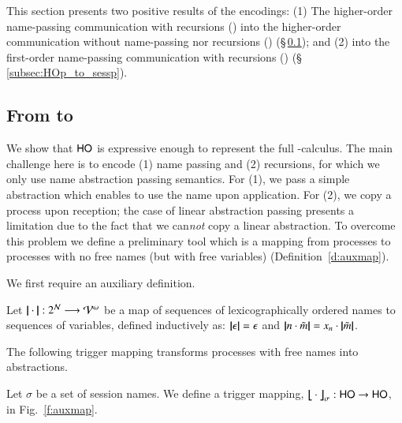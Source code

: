 \noi This section presents two positive results of the encodings:
(1) The higher-order name-passing communication with recursions (\HOp) into 
the higher-order communication without name-passing nor 
recursions (\HO) (\S\,\ref{subsec:HOpi_to_HO}); and (2) 
\HOp into the first-order name-passing communication
with recursions (\sessp) (\S\,\ref{subsec:HOp_to_sessp}). 

\subsection{From \HOp to \HO}
\label{subsec:HOpi_to_HO}
\noi We show that $\mathsf{HO}$ is expressive enough to
represent the full \HOp-calculus.
The main challenge here is to encode (1) name passing 
and (2) recursions, 
for which 
we only use name abstraction passing semantics. For (1), we pass  
a simple abstraction which enables to use the name upon application. 
For (2), we 
copy a process upon reception; the case of linear abstraction passing
presents a limitation due to the fact that we can{\em not} 
copy a linear abstraction.
To overcome this problem we define a preliminary tool which is a mapping from
processes to processes with no free names (but with free variables) (Definition~\ref{d:auxmap}). 

We first require an auxiliary definition.

\smallskip 

\begin{definition}\rm 
\label{def:hop_to_ho}
	Let $|\!|\cdot|\!|: 2^{\mathcal{N}} \longrightarrow \mathcal{V}^\omega$
	be a map of sequences of 
lexicographically ordered names to sequences of variables, defined
	inductively as: 
	$|\!|\epsilon|\!| = \epsilon$ and $|\!|n \cdot \tilde{m}|\!| = x_n \cdot |\!|\tilde{m}|\!|$. 
\end{definition}

\smallskip 

\noi The following trigger mapping transforms processes
with free names into abstractions. 

\smallskip 

\begin{definition} \label{d:trabs}\label{d:auxmap}
	Let $\sigma$ be a set of session names.
	We define a trigger mapping,  
$\big\lfloor\!\!\big\lfloor\cdot\big\rfloor\!\!\big\rfloor^{}_\sigma: \mathsf{HO} \to \mathsf{HO}$, in Fig.~\ref{f:auxmap}.
\end{definition}

